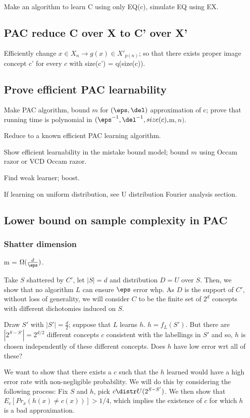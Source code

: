 \documentclass[oneside, article]{memoir}
\begin{document}
Make an algorithm to learn C using only EQ(c), simulate EQ using EX.

\subsection{PAC reduce C over X to C' over X'}
Efficiently change $x \in X_{n} \to g(x) \in X'_{p(n)}$; so that there exists proper image concept c' for every $c$ with size(c') = q(size(c)).

\subsection{Prove efficient PAC learnability}
Make PAC algorithm, bound $m$ for $(\eps, \del)$ approximation of c; prove that running time is polynomial in $(\eps^{-1}, \del^{-1}, size(c), $m$, n)$.

Reduce to a known efficient PAC learning algorithm.

Show efficient learnability in the mistake bound model; bound $m$ using Occam razor or VCD Occam razor.

Find weak learner; boost.

If learning on uniform distribution, see U distribution Fourier analysis section.

\subsection{Lower bound on sample complexity in PAC}
\subsubsection{Shatter dimension}
m = $\Omega(\frac{d}{\eps})$.

\pf Take $S$ shattered by $C'$, let $|S|=d$ and distribution $D = U$ over $S$. Then, we show that no algorithm $L$ can ensure $\eps$ error whp. As $D$ is the support of $C'$, without loss of generality, we will consider $C$ to be the finite set of $2^{d}$ concepts with different dichotomies induced on $S$.

Draw $S'$ with $|S'| = \frac{d}{2}$; suppose that $L$ learns $h$. $h = f_L(S')$. But there are $|2^{S-S'}|= 2^{d/2}$ different concepts $c$ consistent with the labellings in $S'$ and so, $h$ is chosen independently of these different concepts. Does $h$ have low error wrt all of these?

We want to show that there exists a $c$ such that the $h$ learned would have a high error rate with non-negligible probability. We will do this by considering the following process: Fix $S$ and $h$, pick $c \distr U(2^{S-S'})$. We then show that $E_c[Pr_x(h(x) \neq c(x))] > 1/4$, which implies the existence of $c$ for which $h$ is a bad approximation.
\end{document}
